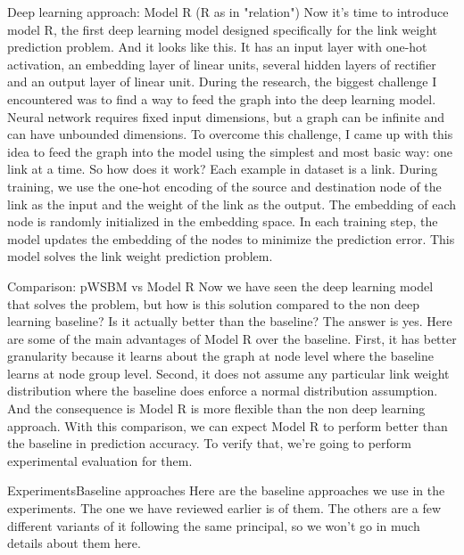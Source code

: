 \documentclass{beamer}
\begin{document}
\begin{frame}{Deep learning approach: Model R (R as in "relation")}
Now it's time to introduce model R, the first deep learning model designed specifically for the link weight prediction problem. And it looks like this. It has an input layer with one-hot activation, an embedding layer of linear units, several hidden layers of rectifier and an output layer of linear unit. During the research, the biggest challenge I encountered was to find a way to feed the graph into the deep learning model. Neural network requires fixed input dimensions, but a graph can be infinite and can have unbounded dimensions. To overcome this challenge, I came up with this idea to feed the graph into the model using the simplest and most basic way: one link at a time. So how does it work? Each example in dataset is a link. During training, we use the one-hot encoding of the source and destination node of the link as the input and the weight of the link as the output. The embedding of each node is randomly initialized in the embedding space. In each training step, the model updates the embedding of the nodes to minimize the prediction error. This model solves the link weight prediction problem.
\end{frame}

\begin{frame}{Comparison: pWSBM vs Model R}
Now we have seen the deep learning model that solves the problem, but how is this solution compared to the non deep learning baseline? Is it actually better than the baseline? The answer is yes. Here are some of the main advantages of Model R over the baseline. First, it has better granularity because it learns about the graph at node level where the baseline learns at node group level. Second, it does not assume any particular link weight distribution where the baseline does enforce a normal distribution assumption. And the consequence is Model R is more flexible than the non deep learning approach. With this comparison, we can expect Model R to perform better than the baseline in prediction accuracy. To verify that, we're going to perform experimental evaluation for them.
\end{frame}

\begin{frame}{Experiments}{Baseline approaches}
Here are the baseline approaches we use in the experiments. The one we have reviewed earlier is of them. The others are a few different variants of it following the same principal, so we won't go in much details about them here.
\end{frame}
\end{document}
